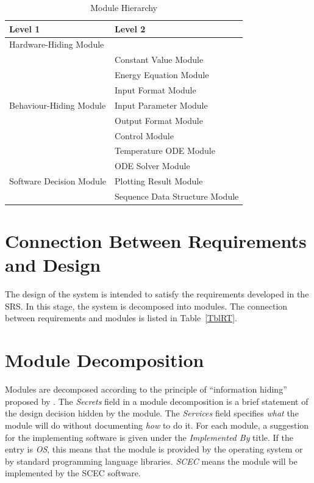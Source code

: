 \documentclass[12pt, titlepage]{article}
\begin{document}
\begin{table}[h!]
\centering
\begin{tabular}{p{} p{}}
\toprule
\textbf{Level 1} & \textbf{Level 2}\\
\midrule
{Hardware-Hiding Module} & ~ \\
\midrule

\multirow{7}{0.3\textwidth}{Behaviour-Hiding Module} 
& Constant Value Module\\ 
& Energy Equation Module\\
& Input Format Module\\
& Input Parameter Module\\
& Output Format Module\\
& Control Module\\
& Temperature ODE Module\\
\midrule

\multirow{3}{0.3\textwidth}{Software Decision Module} 
& ODE Solver Module\\
& Plotting Result Module\\
& Sequence Data Structure Module\\
\bottomrule

\end{tabular}
\caption{Module Hierarchy}
\label{TblMH}
\end{table}

\section{Connection Between Requirements and Design} \label{SecConnection}

The design of the system is intended to satisfy the requirements developed in
the SRS. In this stage, the system is decomposed into modules. The connection
between requirements and modules is listed in Table~\ref{TblRT}.

\section{Module Decomposition} \label{SecMD}

Modules are decomposed according to the principle of ``information hiding''
proposed by \citet{ParnasEtAl1984}. The \emph{Secrets} field in a module
decomposition is a brief statement of the design decision hidden by the
module. The \emph{Services} field specifies \emph{what} the module will do
without documenting \emph{how} to do it. For each module, a suggestion for the
implementing software is given under the \emph{Implemented By} title. If the
entry is \emph{OS}, this means that the module is provided by the operating
system or by standard programming language libraries.  \emph{SCEC} means the
module will be implemented by the SCEC software.
\end{document}
